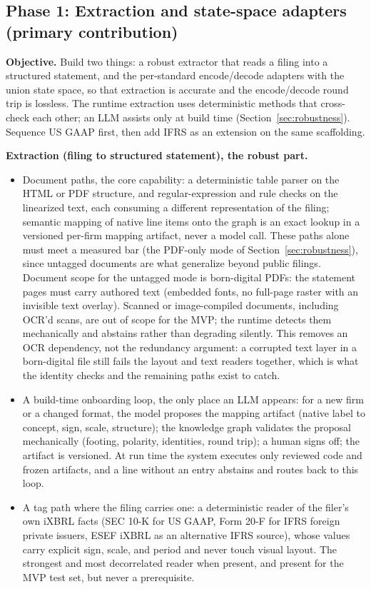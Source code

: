 \documentclass[11pt]{article}
\newcommand{\lead}[2]{\par\addvspace{5pt}\textbf{\textcolor{#1}{#2}}}
\begin{document}
\subsection{Phase 1: Extraction and state-space adapters (primary contribution)}
\lead{navytwo}{Objective.} Build two things: a robust extractor that reads a filing into a structured statement, and the per-standard encode/decode adapters with the union state space, so that extraction is accurate and the encode/decode round trip is lossless. The runtime extraction uses deterministic methods that cross-check each other; an LLM assists only at build time (Section~\ref{sec:robustness}). Sequence US GAAP first, then add IFRS as an extension on the same scaffolding.
\lead{navytwo}{Extraction (filing to structured statement), the robust part.}
\begin{itemize}
  \item Document paths, the core capability: a deterministic table parser on the HTML or PDF structure, and regular-expression and rule checks on the linearized text, each consuming a different representation of the filing; semantic mapping of native line items onto the graph is an exact lookup in a versioned per-firm mapping artifact, never a model call. These paths alone must meet a measured bar (the PDF-only mode of Section~\ref{sec:robustness}), since untagged documents are what generalize beyond public filings. Document scope for the untagged mode is born-digital PDFs: the statement pages must carry authored text (embedded fonts, no full-page raster with an invisible text overlay). Scanned or image-compiled documents, including OCR'd scans, are out of scope for the MVP; the runtime detects them mechanically and abstains rather than degrading silently. This removes an OCR dependency, not the redundancy argument: a corrupted text layer in a born-digital file still fails the layout and text readers together, which is what the identity checks and the remaining paths exist to catch.
  \item A build-time onboarding loop, the only place an LLM appears: for a new firm or a changed format, the model proposes the mapping artifact (native label to concept, sign, scale, structure); the knowledge graph validates the proposal mechanically (footing, polarity, identities, round trip); a human signs off; the artifact is versioned. At run time the system executes only reviewed code and frozen artifacts, and a line without an entry abstains and routes back to this loop.
  \item A tag path where the filing carries one: a deterministic reader of the filer's own iXBRL facts (SEC 10-K for US GAAP, Form 20-F for IFRS foreign private issuers, ESEF iXBRL as an alternative IFRS source), whose values carry explicit sign, scale, and period and never touch visual layout. The strongest and most decorrelated reader when present, and present for the MVP test set, but never a prerequisite.

\end{itemize}
\end{document}
